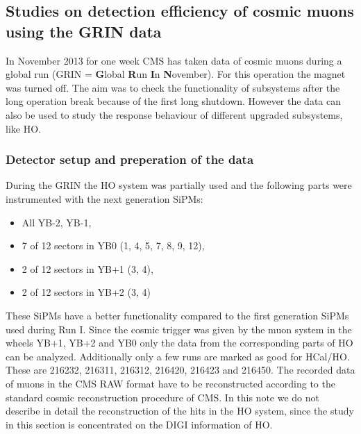 	\subsection{Studies on detection efficiency of cosmic muons using the GRIN data} 
		In November 2013 for one week CMS has taken data of cosmic muons during a global run (GRIN = \textbf{G}lobal \textbf{R}un \textbf{I}n \textbf{N}ovember).
		For this operation the magnet was turned off.
		The aim was to check the functionality of subsystems after the long operation break because of the first long shutdown.
		However the data can also be used to study the response behaviour of different upgraded subsystems, like HO.
		\subsubsection{Detector setup and preperation of the data}
			During the GRIN the HO system was partially used and the following parts were instrumented with the next generation SiPMs:
			\begin{itemize}
				\item All YB-2, YB-1,
				\item 7 of 12 sectors in YB0 (1, 4, 5, 7, 8, 9, 12),
				\item 2 of 12 sectors in YB+1 (3, 4),
				\item 2 of 12 sectors in YB+2 (3, 4)
			\end{itemize}
			These SiPMs have a better functionality compared to the first generation SiPMs used during Run I.
			Since the cosmic trigger was given by the muon system in the wheels YB+1, YB+2 and YB0 only the data from the corresponding parts of HO can be analyzed.
			Additionally only a few runs are marked as good for HCal/HO.
			These are 216232, 216311, 216312, 216420, 216423 and 216450.
			The recorded data of muons in the CMS RAW format have to be reconstructed according to the standard cosmic reconstruction procedure of CMS.
			In this note we do not describe in detail the reconstruction of the hits in the HO system, since the study in this section is concentrated on the DIGI information of HO.
